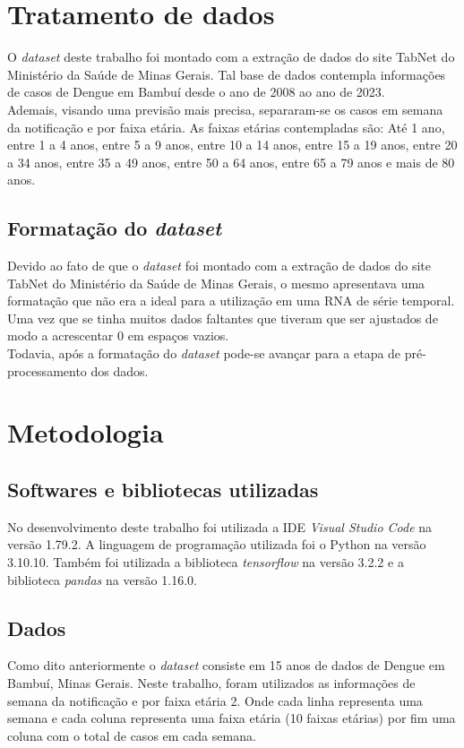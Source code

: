 \documentclass[
	article,			%
	11pt,				%
	a4paper,			%
	chapter=TITLE,		%
	section=TITLE,		%
	subsection=TITLE,	%
	subsubsection=TITLE %
	english,			%
	brazil,				%
	sumario=tradicional
	]{abntex2}
\begin{document}
\section{Tratamento de dados}
O \textit{dataset} deste trabalho foi montado com a extração de dados do site TabNet do Ministério da Saúde de Minas Gerais. Tal base de dados contempla informações de casos de Dengue em Bambuí desde o ano de 2008 ao ano de 2023. 
\\ \indent Ademais, visando uma previsão mais precisa, separaram-se os casos em semana da notificação e por faixa etária. 
As faixas etárias contempladas são: Até 1 ano, entre 1 a 4 anos, entre 5 a 9 anos, entre 10 a 14 anos, entre 15 a 19 anos, entre 20 a 34 anos, entre 35 a 49 anos, entre 50 a 64 anos, entre 65 a 79 anos e mais de 80 anos.
\subsection{Formatação do \textit{dataset}}
Devido ao fato de que o \textit{dataset} foi montado com a extração de dados do site TabNet do Ministério da Saúde de Minas Gerais, o mesmo apresentava uma formatação que não era a ideal para a utilização em uma RNA de série temporal. Uma vez que se tinha muitos dados faltantes que tiveram que ser ajustados de modo a acrescentar 0 em espaços vazios.
\\ \indent
Todavia, após a formatação do \textit{dataset} pode-se avançar para a etapa de pré-processamento dos dados.


\section{Metodologia}
\subsection{Softwares e bibliotecas utilizadas}
No desenvolvimento deste trabalho foi utilizada a IDE \textit{Visual Studio Code} na versão 1.79.2. A linguagem de programação utilizada foi o Python na versão 3.10.10. 
Também foi utilizada a biblioteca \textit{tensorflow} na versão 3.2.2 e a biblioteca \textit{pandas} na versão 1.16.0. 

\subsection{Dados}
Como dito anteriormente o \textit{dataset} consiste em 15 anos de dados de Dengue em Bambuí, Minas Gerais. Neste trabalho, foram utilizados as informações de semana da notificação e por faixa etária 2. Onde cada linha representa uma semana e cada coluna representa uma faixa etária (10 faixas etárias) por fim uma coluna com o total de casos em cada semana.
\end{document}

